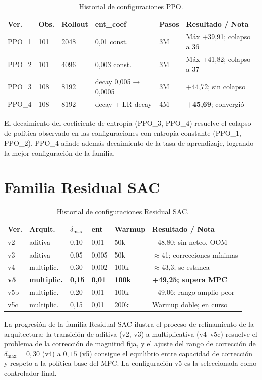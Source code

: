 \documentclass[12pt, a4paper, twoside]{report}
\begin{document}
\begin{table}[H]
\centering
\caption{Historial de configuraciones PPO.}
\label{tab:hist_ppo}
\small
\begin{tabularx}{\textwidth}{lL{1.2cm}L{1.6cm}L{2.2cm}L{1cm}X}
\toprule
\textbf{Ver.} & \textbf{Obs.} & \textbf{Rollout} & \textbf{ent\_coef} &
\textbf{Pasos} & \textbf{Resultado / Nota} \\
\midrule
PPO\_1 & 101 & 2048 & 0{,}01 const. & 3M & Máx +39{,}91; colapso a 36 \\
PPO\_2 & 101 & 4096 & 0{,}003 const. & 3M & Máx +41{,}82; colapso a 37 \\
PPO\_3 & 108 & 8192 & decay 0{,}005$\to$0{,}0005 & 3M & +44{,}72; sin colapso \\
PPO\_4 & 108 & 8192 & decay + LR decay & 4M & \textbf{+45{,}69}; convergió \\
\bottomrule
\end{tabularx}
\end{table}

El decaimiento del coeficiente de entropía (PPO\_3, PPO\_4) resuelve el colapso
de política observado en las configuraciones con entropía constante (PPO\_1,
PPO\_2). PPO\_4 añade además decaimiento de la tasa de aprendizaje, logrando la
mejor configuración de la familia.

\section{Familia Residual SAC}

\begin{table}[H]
\centering
\caption{Historial de configuraciones Residual SAC.}
\label{tab:hist_sac}
\small
\begin{tabularx}{\textwidth}{lL{2cm}L{1.3cm}L{1.2cm}L{1.3cm}X}
\toprule
\textbf{Ver.} & \textbf{Arquit.} & \textbf{$\delta_{\max}$} &
\textbf{ent} & \textbf{Warmup} & \textbf{Resultado / Nota} \\
\midrule
v2 & aditiva & 0{,}10 & 0{,}01 & 50k & +48{,}80; sin neteo, OOM \\
v3 & aditiva & 0{,}05 & 0{,}005 & 50k & $\approx$41; correcciones mínimas \\
v4 & multiplic. & 0{,}30 & 0{,}002 & 100k & $\approx$43{,}3; se estanca \\
\textbf{v5} & \textbf{multiplic.} & \textbf{0{,}15} & \textbf{0{,}01} &
\textbf{100k} & \textbf{+49{,}25; supera MPC} \\
v5b & multiplic. & 0{,}20 & 0{,}01 & 100k & +49{,}06; rango amplio peor \\
v5c & multiplic. & 0{,}15 & 0{,}01 & 200k & Warmup doble; en curso \\
\bottomrule
\end{tabularx}
\end{table}

La progresión de la familia Residual SAC ilustra el proceso de refinamiento de
la arquitectura: la transición de aditiva (v2, v3) a multiplicativa (v4--v5c)
resuelve el problema de la corrección de magnitud fija, y el ajuste del rango
de corrección de $\delta_{\max} = 0{,}30$ (v4) a $0{,}15$ (v5) consigue el
equilibrio entre capacidad de corrección y respeto a la política base del MPC.
La configuración v5 es la seleccionada como controlador final.
\end{document}
